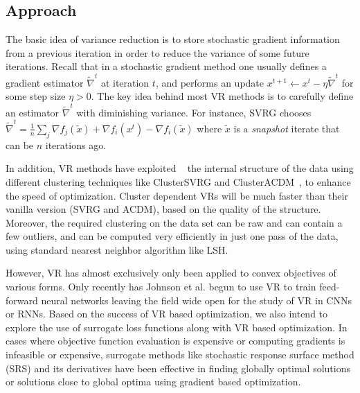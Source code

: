 \documentclass{article} %
\begin{document}
\subsection{Approach}

\newcommand{\tnabla}{\tilde{\nabla}}
\newcommand{\tx}{\tilde{x}}
\newcommand{\bx}{\bar{x}}
\newcommand{\lt}{\mathsf{lt}}
\newcommand{\li}{\mathsf{li}}
\newcommand{\cH}{H_{\mathsf{cl}}}

The basic idea of variance reduction is to store stochastic gradient information from a previous iteration in order to reduce the variance of some future iterations. Recall that in a stochastic gradient method one usually defines a gradient estimator $\tnabla^t$ at iteration $t$, and performs an update $x^{t+1} \gets x^t - \eta \tnabla^t$ for some step size $\eta>0$.
The key idea behind most VR methods is to carefully define an estimator $\tnabla^t$ with diminishing variance. For instance, SVRG chooses $\tnabla^t = \frac{1}{n} \sum_j \nabla f_j(\tx) + \nabla f_i(x^t) - \nabla f_i(\tx)$ where $\tx$ is a \emph{snapshot} iterate that can be $n$ iterations ago.

In addition, VR methods have exploited ~\cite{exploitingstructure,HLM2015} the internal structure of the data using different clustering techniques like ClusterSVRG and ClusterACDM~\cite{exploitingstructure}, to enhance the speed of optimization. Cluster dependent VRs will be much faster than their vanilla version (SVRG and ACDM), based on the quality of the structure.   
Moreover, the required clustering on the data set can be raw and can contain a few outliers, and can be computed very efficiently in just one pass of the data, using standard nearest neighbor algorithm like LSH. 

However, VR has almost exclusively only been applied to convex objectives of various forms. Only recently has Johnson et al. begun to use VR to train feed-forward neural networks \cite{JohnsonZhang2013-SVRG} leaving the field wide open for the study of VR in CNNs or RNNs. Based on the success of VR based optimization, we also intend to explore the use of surrogate loss functions along with VR based optimization. In cases where objective function evaluation is expensive or computing gradients is infeasible or expensive, surrogate methods like stochastic response surface method (SRS) and its derivatives \cite{regis-2007} have been effective in finding globally optimal solutions or solutions close to global optima using gradient based optimization.
\end{document}

